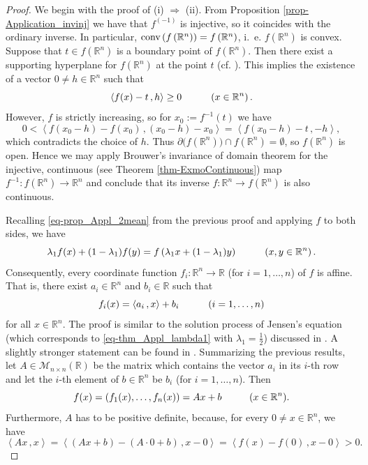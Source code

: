 \documentclass[12pt]{amsart}
\theoremstyle{remark}
\theoremstyle{definition}
\newcommand{\RR}{\mathbb{R}}
\newcommand{\Rn}{\mathbb{R}^n}
\newcommand{\conv}{\mbox{\rm conv}}
\newcommand{\map}{\longrightarrow}
\newcommand{\bsz}[2]{\left \langle #1 \,, #2 \right \rangle}
\begin{document}
\begin{proof} 
We begin with the proof of (i) $ \Longrightarrow $ (ii). 
From Proposition \ref{prop-Application_invinj} 
we have that $ f^{(-1)} $ is injective, so 
it coincides with the ordinary inverse. 
In particular, 
$ \conv \left( f \left( \Rn \right) \right) = 
f \left( \Rn \right) $, i.~e. $ f \left( \Rn \right) $ 
is convex. Suppose that $ t \in f \left( \Rn \right) $ 
is a boundary point of $ f \left( \Rn \right) $. 
Then there exist a supporting 
hyperplane for $ f \left( \Rn \right) $ at the 
point $ t $ (cf. \cite[Theorem 11.6]{Roc70}). 
This implies the existence of a vector 
$ 0 \neq h \in \Rn $ such that 
\[ 
\bsz{f(x)-t}{h} \geq 0 
\hspace{10mm} \left( x \in \Rn \right). 
\]
However, $ f $ is strictly increasing, so 
for $ x_0 := f^{-1}(t) $ we have 
\[ 
0< \bsz{f(x_0 - h)-f(x_0)}{
(x_0-h)-x_0} = 
\bsz{f(x_0 - h) - t}{-h}, 
\] 
which contradicts the choice of $ h $. Thus 
$ \partial \bigl( f \left( \Rn \right) \bigr) 
\cap f \left( \Rn \right) 
= \emptyset $, so $ f(\Rn) $ is open. 
Hence we may apply Brouwer's invariance of domain 
theorem for the injective, continuous 
(see Theorem \ref{thm-ExmoContinuous}) map 
$ f^{-1} : f \left( \Rn \right) \map \Rn $ and 
conclude that its inverse $ f : \Rn \to f(\Rn) $ 
is also continuous. 

Recalling 
\eqref{eq-prop_Appl_2mean} from the previous proof and 
applying $ f $ to both sides, we have 
\begin{equation}\label{eq-thm_Appl_lambda1}
\lambda_1 f(x) + (1-\lambda_1) f(y) 
= f \left( \lambda_1 x + (1-\lambda_1) y \right) 
\hspace{10mm} \left( x,y \in \Rn \right). 
\end{equation}
Consequently, every coordinate function 
$ f_i : \Rn \map \RR $ (for $ i = 1 , \dots , n $) of $ f $ 
is affine. That is, 
there exist $ a_i \in \Rn $ and $ b_i \in \RR $ 
such that 
\[
f_i(x) = \bsz{a_i}{x} + b_i 
\hspace{10mm} \left( i = 1, \dots , n \right)
\]
for all $ x \in \Rn $. The proof is similar to 
the solution process of Jensen's equation 
(which corresponds to \eqref{eq-thm_Appl_lambda1} with 
$ \lambda_1 = \frac{1}{2} $) discussed in 
\cite[Section 13.2]{Kuc09}. 
A slightly stronger statement can be found in 
\cite[Theorem 3.1]{BT26}. 
Summarizing the previous results, let 
$ A \in \mathcal{M}_{n \times n}(\RR) $ be the matrix 
which contains the vector $ a_i $ in its $ i $-th 
row and let the $ i $-th element of $ b \in \Rn $ 
be $ b_i $ (for $ i = 1 , \dots , n $). 
Then 
\[
f(x) = \left( f_1(x) , \dots , f_n(x) \right) = 
Ax + b 
\hspace{10mm} (x \in \Rn). 
\]
Furthermore, $ A $ has to be positive definite, because, 
for every $ 0 \neq x \in \Rn $, we have 
\[
\bsz{Ax}{x} = \bsz{(Ax+b)-(A \cdot 0+b)}{x-0} = 
\bsz{f(x)-f(0)}{x-0} > 0. 
\]


\end{proof}
\end{document}
